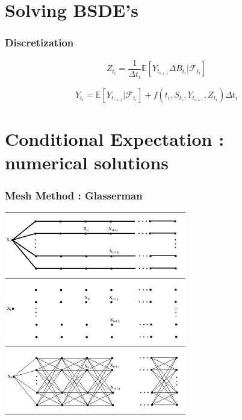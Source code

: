 \documentclass[10pt]{beamer}
\begin{document}
\section{Solving BSDE's}

\begin{frame}
	\frametitle{Discretization}
	
	
	\begin{displaymath}
	Z_{t_i} = \frac{1}{\Delta t_i}\mathbb{E}[Y_{t_{i + 1}} \Delta B_{t_i}  | \mathcal{F}_{t_i}]
	\end{displaymath}
	
	\begin{displaymath}
	Y_{t_i} = \mathbb{E}[Y_{t_{i + 1}} | \mathcal{F}_{t_i}] +  f(t_i,S_{t_i}, Y_{t_{i + 1}}, Z_{t_i})\Delta t_i
	\end{displaymath}
	
\end{frame}


\section{Conditional Expectation : numerical solutions}

   \begin{frame}
   	\frametitle{Mesh Method : Glasserman}
   	\centering
   	 \includegraphics[scale = 0.6]{mesh_figure.png} 
   	 

   	
   \end{frame}
  
\end{document}
